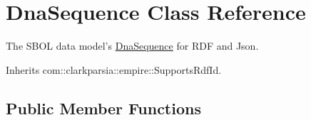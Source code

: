 \hypertarget{classorg_1_1sbolstandard_1_1lib_s_b_o_lj_1_1_dna_sequence}{
\section{DnaSequence Class Reference}
\label{classorg_1_1sbolstandard_1_1lib_s_b_o_lj_1_1_dna_sequence}
}


The SBOL data model's \hyperlink{classorg_1_1sbolstandard_1_1lib_s_b_o_lj_1_1_dna_sequence}{DnaSequence} for RDF and Json.  




Inherits com::clarkparsia::empire::SupportsRdfId.

\subsection*{Public Member Functions}
